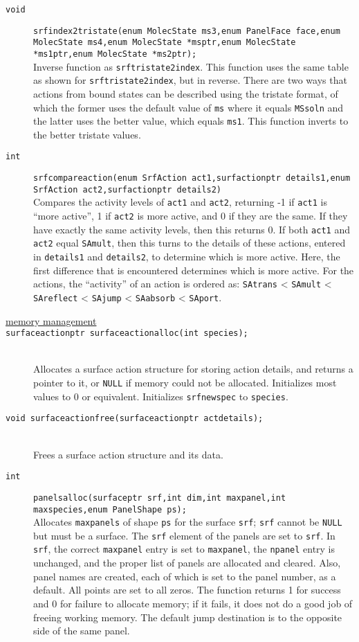 \documentclass {scrbook}
\newcommand {\ttt} {\texttt}
\begin{document}
\begin{description}
\item[\ttt{void}]
\ttt{srfindex2tristate(enum MolecState ms3,enum PanelFace face,enum MolecState ms4,enum MolecState *msptr,enum MolecState *ms1ptr,enum MolecState *ms2ptr);}
\hfill \\
Inverse function as \ttt{srftristate2index}. This function uses the same table as shown for \ttt{srftristate2index}, but in reverse. There are two ways that actions from bound states can be described using the tristate format, of which the former uses the default value of \ttt{ms} where it equals \ttt{MSsoln} and the latter uses the better value, which equals \ttt{ms1}. This function inverts to the better tristate values.

\item[\ttt{int}]
\ttt{srfcompareaction(enum SrfAction act1,surfactionptr details1,enum SrfAction act2,surfactionptr details2)}
\hfill \\
Compares the activity levels of \ttt{act1} and \ttt{act2}, returning -1 if \ttt{act1} is ``more active'', 1 if \ttt{act2} is more active, and 0 if they are the same. If they have exactly the same activity levels, then this returns 0. If both \ttt{act1} and \ttt{act2} equal \ttt{SAmult}, then this turns to the details of these actions, entered in \ttt{details1} and \ttt{details2}, to determine which is more active. Here, the first difference that is encountered determines which is more active. For the actions, the ``activity'' of an action is ordered as: \ttt{SAtrans} < \ttt{SAmult} < \ttt{SAreflect} < \ttt{SAjump} < \ttt{SAabsorb} < \ttt{SAport}.

\item[\underline{memory management}]

\item[\ttt{surfaceactionptr surfaceactionalloc(int species);}]
\hfill \\
Allocates a surface action structure for storing action details, and returns a pointer to it, or \ttt{NULL} if memory could not be allocated. Initializes most values to 0 or equivalent. Initializes \ttt{srfnewspec} to \ttt{species}.

\item[\ttt{void surfaceactionfree(surfaceactionptr actdetails);}]
\hfill \\
Frees a surface action structure and its data.

\item[\ttt{int}]
\ttt{panelsalloc(surfaceptr srf,int dim,int maxpanel,int maxspecies,enum PanelShape ps);}
\hfill \\
Allocates \ttt{maxpanels} of shape \ttt{ps} for the surface \ttt{srf}; \ttt{srf} cannot be \ttt{NULL} but must be a surface. The \ttt{srf} element of the panels are set to \ttt{srf}. In \ttt{srf}, the correct \ttt{maxpanel} entry is set to \ttt{maxpanel}, the \ttt{npanel} entry is unchanged, and the proper list of panels are allocated and cleared. Also, panel names are created, each of which is set to the panel number, as a default. All points are set to all zeros. The function returns 1 for success and 0 for failure to allocate memory; if it fails, it does not do a good job of freeing working memory. The default jump destination is to the opposite side of the same panel.


\end{description}
\end{document}
